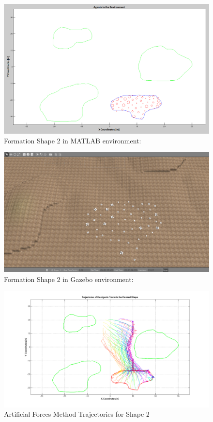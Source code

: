 \documentclass[twoside]{article}
\begin{document}
		   \begin{figure}[H]
		   	\caption{Formation Shape 2 in MATLAB environment:}
		   	\centerline{\includegraphics[scale = 0.40]{Trajectories_Formation_Shape_2_2}}
		   \end{figure} 	
		   
		   \begin{figure}[H]
		   	\caption{Formation Shape 2 in Gazebo environment:}
		   	\centerline{\includegraphics[scale = 0.35]{Trajectories_Formation_Shape_2_1}}
		   \end{figure} 	
		   
		   \begin{figure}[H]
		   	\caption{Artificial Forces Method Trajectories for Shape 2}
		   	\centerline{\includegraphics[scale = 0.35]{Artificial_Trajectories_2}}
		   \end{figure} 	
		   
\end{document}
